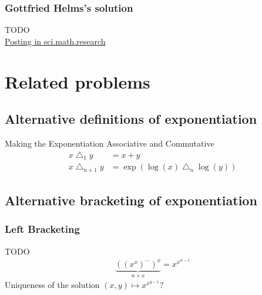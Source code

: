\documentclass[12pt]{article}
\theoremstyle{definition}
\newcommand{\tlog}[2]{\tlogs_{#1}(#2)}
\DeclareMathOperator{\tlogs}{tlog}
\begin{document}

\subsubsection{Gottfried Helms's solution}
TODO\\
\href{http://groups.google.com/group/sci.math.research/browse_frm/thread/ea22b51bfa76c8a9/744173f195b78e1a#744173f195b78e1a}{Posting in sci.math.research}


\section{Related problems}
\subsection{Alternative definitions of exponentiation}
Making the Exponentiation Associative and Commutative
\begin{align*}
  x\bigtriangleup_1 y &= x+y\\
  x\bigtriangleup_{n+1} y &= \exp (\log(x)\bigtriangleup_n \log(y))
\end{align*}

\subsection{Alternative bracketing of exponentiation}
\label{alternative bracketings}
\subsubsection{Left Bracketing}
TODO
\begin{align*}
  \underbrace{((x^x)^{\dotsb})^x}_{n\times x} = x^{x^{n-1}}
\end{align*}
Uniqueness of the solution $(x,y)\mapsto x^{x^{y-1}}$?
\end{document}
